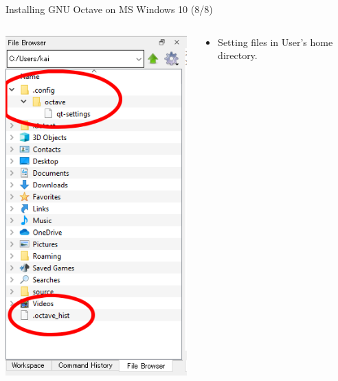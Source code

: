 \begin{frame}{Installing GNU Octave on MS Windows 10 (8/8)}
\begin{columns}
\begin{column}{0.25\textwidth}
\includegraphics[width=\textwidth]{res/ms_windows/win_octave_settings.png}
\end{column}
\begin{column}{0.6\textwidth}
\begin{itemize}
\itemsep2em
\item
Setting files in User's home directory.


\end{itemize}
\end{column}
\end{columns}
\end{frame}
